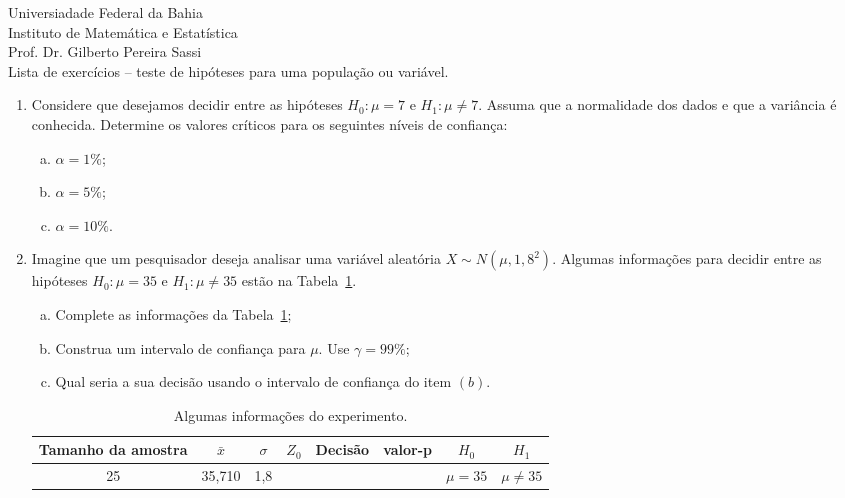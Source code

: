 \documentclass[12pt, a4paper]{article}
\begin{document}
\begin{center}
Universiadade Federal da Bahia\\
Instituto de Matemática e Estatística\\
Prof. Dr. Gilberto Pereira Sassi\\
\vspace{1cm}
Lista de exercícios -- teste de hipóteses para uma população ou variável.
\vspace{1cm}
\end{center}

\begin{enumerate}
	\item Considere que desejamos decidir entre as hipóteses $H_0:\mu = 7$ e $H_1: \mu \neq 7$. Assuma que a normalidade dos dados e que a variância é conhecida. Determine os valores críticos para os seguintes níveis de confiança:
	\begin{enumerate}[(a)]
		\item $\alpha=1\%$;
		\item $\alpha=5\%$;
		\item $\alpha=10\%$.
	\end{enumerate}

	\item Imagine que um pesquisador deseja analisar uma variável aleatória $X \sim N(\mu, 1,8^2)$. Algumas informações para decidir entre as hipóteses $H_0: \mu = 35$ e $H_1: \mu \neq 35$ estão na Tabela~\ref{tab:exe2}.
	\begin{enumerate}[(a)]
		\item Complete as informações da Tabela~\ref{tab:exe2};
		\item Construa um intervalo de confiança para $\mu$. Use $\gamma = 99\%$;
		\item Qual seria a sua decisão usando o intervalo de confiança do item $(b)$.
	\end{enumerate}
	\begin{table}[htbp]
		\centering
		\begin{tabular}{c|c|c|c|c|c|c|c}
			\toprule[0.05cm]
			Tamanho da amostra & $\bar{x}$ & $\sigma$ & $Z_0$ & Decisão & valor-p & $H_0$ & $H_1$ \\ \midrule[0.025cm]
			25 & 35,710 & 1,8 & & & & $\mu = 35$ & $\mu \neq 35$ \\
			\bottomrule[0.05cm]
		\end{tabular}
		\caption{Algumas informações do experimento.}
		\label{tab:exe2}
	\end{table}


\end{enumerate}
\end{document}
